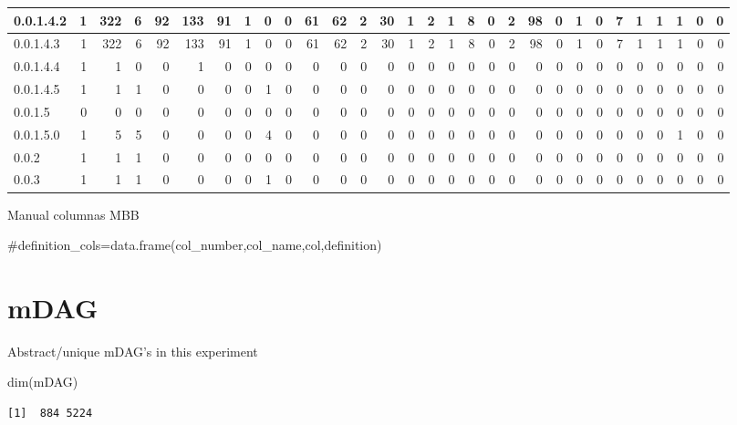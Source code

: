 \documentclass[
  letterpaper,
  DIV=11,
  numbers=noendperiod]{scrreprt}
\newenvironment{Shaded}{\begin{snugshade}}{\end{snugshade}}
\newcommand{\CommentTok}[1]{\textcolor[rgb]{0.37,0.37,0.37}{#1}}
\newcommand{\FunctionTok}[1]{\textcolor[rgb]{0.28,0.35,0.67}{#1}}
\newcommand{\NormalTok}[1]{\textcolor[rgb]{0.00,0.23,0.31}{#1}}
\begin{document}
\begin{tabular}{l|r|r|r|r|r|r|r|r|r|r|r|r|r|r|r|r|r|r|r|r|r|r|r|r|r|r|r|r|r}
\hline
0.0.1.4.2 & 1 & 322 & 6 & 92 & 133 & 91 & 1 & 0 & 0 & 61 & 62 & 2 & 30 & 1 & 2 & 1 & 8 & 0 & 2 & 98 & 0 & 1 & 0 & 7 & 1 & 1 & 1 & 0 & 0\\
\hline
0.0.1.4.3 & 1 & 322 & 6 & 92 & 133 & 91 & 1 & 0 & 0 & 61 & 62 & 2 & 30 & 1 & 2 & 1 & 8 & 0 & 2 & 98 & 0 & 1 & 0 & 7 & 1 & 1 & 1 & 0 & 0\\
\hline
0.0.1.4.4 & 1 & 1 & 0 & 0 & 1 & 0 & 0 & 0 & 0 & 0 & 0 & 0 & 0 & 0 & 0 & 0 & 0 & 0 & 0 & 0 & 0 & 0 & 0 & 0 & 0 & 0 & 0 & 0 & 0\\
\hline
0.0.1.4.5 & 1 & 1 & 1 & 0 & 0 & 0 & 0 & 1 & 0 & 0 & 0 & 0 & 0 & 0 & 0 & 0 & 0 & 0 & 0 & 0 & 0 & 0 & 0 & 0 & 0 & 0 & 0 & 0 & 0\\
\hline
0.0.1.5 & 0 & 0 & 0 & 0 & 0 & 0 & 0 & 0 & 0 & 0 & 0 & 0 & 0 & 0 & 0 & 0 & 0 & 0 & 0 & 0 & 0 & 0 & 0 & 0 & 0 & 0 & 0 & 0 & 0\\
\hline
0.0.1.5.0 & 1 & 5 & 5 & 0 & 0 & 0 & 0 & 4 & 0 & 0 & 0 & 0 & 0 & 0 & 0 & 0 & 0 & 0 & 0 & 0 & 0 & 0 & 0 & 0 & 0 & 0 & 1 & 0 & 0\\
\hline
0.0.2 & 1 & 1 & 1 & 0 & 0 & 0 & 0 & 0 & 0 & 0 & 0 & 0 & 0 & 0 & 0 & 0 & 0 & 0 & 0 & 0 & 0 & 0 & 0 & 0 & 0 & 0 & 0 & 0 & 0\\
\hline
0.0.3 & 1 & 1 & 1 & 0 & 0 & 0 & 0 & 1 & 0 & 0 & 0 & 0 & 0 & 0 & 0 & 0 & 0 & 0 & 0 & 0 & 0 & 0 & 0 & 0 & 0 & 0 & 0 & 0 & 0\\
\hline
\end{tabular}

Manual columnas MBB

\begin{Shaded}
\begin{Highlighting}[]
\CommentTok{\#definition\_cols=data.frame(col\_number,col\_name,col,definition)}
\end{Highlighting}
\end{Shaded}

\hypertarget{mdag}{%
\section{mDAG}\label{mdag}}

Abstract/unique mDAG's in this experiment

\begin{Shaded}
\begin{Highlighting}[]
\FunctionTok{dim}\NormalTok{(mDAG)}
\end{Highlighting}
\end{Shaded}

\begin{verbatim}
[1]  884 5224
\end{verbatim}
\end{document}
